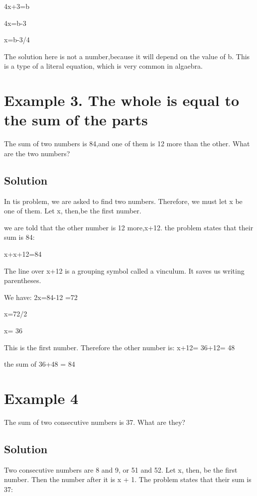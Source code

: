 \documentclass[12pt]{article}%
\begin{document}
          4x+3=b
          
          4x=b-3
          
          x=b-3/4
          
 The solution here is not a number,because it will depend on the value of b. This is a type of a literal equation, which is very common in algaebra.

\section{Example 3. The whole is equal to the sum of the parts}

The sum of two numbers is 84,and one of them is 12 more than the other. What are the two numbers?

\subsection{Solution}
In tis problem, we are asked to find two numbers. Therefore, we must let x be one of them. Let x, then,be the first number.

  we are told that the other number is 12 more,x+12.
  the problem states that their sum is 84: 
                         
                       x+x+12=84
                       
 The line over x+12 is a grouping symbol called a vinculum. It saves us writing parentheses.
 
 We have:
 2x=84-12
          =72
          
          x=72/2
          
          x= 36
          
          
This is the first number. Therefore the other number is:
     x+12= 36+12= 48
     
     the sum of 36+48 = 84
    
\section{Example 4}     

The sum of two consecutive numbers is 37. What are they?

\subsection{Solution}

Two consecutive numbers are 8 and 9, or 51 and 52. Let x, then, be the first number. Then the number after it is x + 1. The problem states that their sum is 37:  
\end{document}
